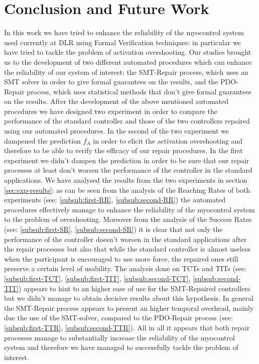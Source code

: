 \chapter{Conclusion and Future Work}\label{c:conclusion}
In this work we have tried to enhance the reliability of the myocontrol system used currently at DLR using Formal Verification techniques: in particular we have tried to tackle the problem of activation overshooting. Our studies brought us to the development of two different automated procedures which can enhance the reliability of our system of interest: the SMT-Repair process, which uses an SMT solver in order to give formal guarantees on the results, and the PDO-Repair process, which uses statistical methods that don't give formal guarantees on the results. After the development of the above mentioned automated procedures we have designed two experiment in order to compare the performance of the standard controller and those of the two controllers repaired using our automated procedures. In the second of the two experiment we dampened the prediction $f_{A}$ in order to elicit the activation overshooting and therefore to be able to verify the efficacy of our repair procedures. In the first experiment we didn't dampen the prediction in order to be sure that our repair processes at least don't worsen the performance of the controller in the standard applications.
We have analysed the results from the two experiments in section \ref{sec:exp-results}: as can be seen from the analysis of the Reaching Rates of both experiments (see: \ref{subsub:first-RR}, \ref{subsub:second-RR}) the automated procedures effectively manage to enhance the reliability of the myocontrol system to the problem of overshooting. Moreover from the analysis of the Success Rates (see: \ref{subsub:first-SR}, \ref{subsub:second-SR}) it is clear that not only the performance of the controller doesn't worsen in the standard applications after the repair processes but also that while the standard controller is almost useless when the participant is encouraged to use more force, the repaired ones still preserve a certain level of usability. The analysis done on TCTs and TITs (see: \ref{subsub:first-TCT}, \ref{subsub:first-TIT}, \ref{subsub:second-TCT}, \ref{subsub:second-TIT}) appears to hint to an higher ease of use for the SMT-Repaired controllers but we didn't manage to obtain decisive results about this hypothesis. In general the SMT-Repair process appears to present an higher temporal overhead, mainly due the use of the SMT-solver, compared to the PDO-Repair process (see: \ref{subsub:first-TTR}, \ref{subsub:second-TTR}). All in all it appears that both repair processes manage to substantially increase the reliability of the myocontrol system and therefore we have managed to successfully tackle the problem of interest.